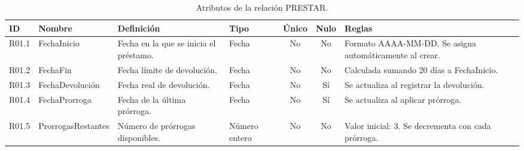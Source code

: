 	\begin{table}[H]
		\centering
		\caption{Atributos de la relación PRESTAR.}
		\label{tab:dict_atributos_prestar}
		\small
		\begin{tabularx}{\textwidth}{l l X l c c X}
			\toprule
			\textbf{ID} & \textbf{Nombre} & \textbf{Definición} & \textbf{Tipo} & \textbf{Único} & \textbf{Nulo} & \textbf{Reglas} \\
			\midrule
			R01.1 & FechaInicio & Fecha en la que se inicia el préstamo. & Fecha & No & No & Formato AAAA-MM-DD. Se asigna automáticamente al crear. \\
			\addlinespace
			R01.2 & FechaFin & Fecha límite de devolución. & Fecha & No & No & Calculada sumando 20 días a FechaInicio. \\
			\addlinespace
			R01.3 & FechaDevolución & Fecha real de devolución. & Fecha & No & Sí & Se actualiza al registrar la devolución. \\
			\addlinespace
			R01.4 & FechaProrroga & Fecha de la última prórroga. & Fecha & No & Sí & Se actualiza al aplicar prórroga. \\
			\addlinespace
			R01.5 & ProrrogasRestantes & Número de prórrogas disponibles. & Número entero & No & No & Valor inicial: 3. Se decrementa con cada prórroga. \\
			\bottomrule
		\end{tabularx}
	\end{table}